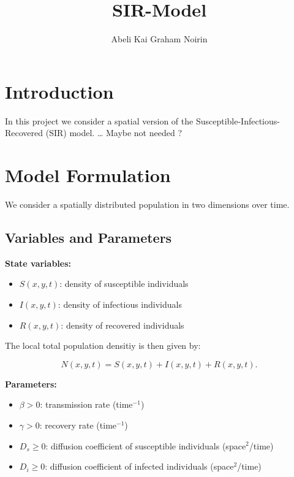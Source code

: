 \documentclass[
  letterpaper,
  DIV=11,
  numbers=noendperiod]{scrartcl}
\title{SIR-Model}
\author{Abeli Kai Graham Noirin}
\date{}
\providecommand{\tightlist}{%
  \setlength{\itemsep}{0pt}\setlength{\parskip}{0pt}}
\begin{document}
\maketitle


\section{Introduction}\label{introduction}

In this project we consider a spatial version of the
Susceptible-Infectious-Recovered (SIR) model. \ldots{} Maybe not needed
?

\section{Model Formulation}\label{model-formulation}

We consider a spatially distributed population in two dimensions over
time.

\subsection{Variables and Parameters}\label{variables-and-parameters}

\textbf{State variables:}

\begin{itemize}
\tightlist
\item
  \(S(x,y,t)\): density of susceptible individuals
\item
  \(I(x,y,t)\): density of infectious individuals
\item
  \(R(x,y,t)\): density of recovered individuals
\end{itemize}

The local total population densitiy is then given by:

\[ N(x,y,t) = S(x,y,t) + I(x,y,t) + R(x,y,t). \]

\textbf{Parameters:}

\begin{itemize}
\tightlist
\item
  \(\beta > 0\): transmission rate (time\(^{-1}\))
\item
  \(\gamma > 0\): recovery rate (time\(^{-1}\))
\item
  \(D_s \ge 0\): diffusion coefficient of susceptible individuals
  (space\(^2\)/time)
\item
  \(D_i \ge 0\): diffusion coefficient of infected individuals
  (space\(^2\)/time)
\end{itemize}
\end{document}
